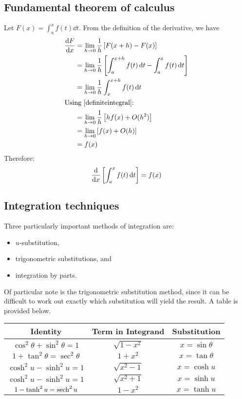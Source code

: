 \subsection{Fundamental theorem of calculus}
Let \(F(x) = \int_{a}^{x} f(t) \dd{t}\).
From the definition of the derivative, we have
\begin{align*}
	\frac{\dd{F}}{\dd{x}} & = \lim_{h \to 0} \frac{1}{h} \left[ F(x+h) - F(x) \right]                                         \\
	                      & = \lim_{h \to 0} \frac{1}{h} \left[ \int_{a}^{x+h} f(t) \dd{t} - \int_{a}^{x} f(t) \dd{t} \right] \\
	                      & = \lim_{h \to 0} \frac{1}{h} \int_{x}^{x+h} f(t) \dd{t}                                           \\
	\intertext{Using \eqref{definiteintegral}:}
	                      & = \lim_{h \to 0} \frac{1}{h} \left[ hf(x) + O(h^2) \right]                                        \\
	                      & = \lim_{h \to 0} \left[ f(x) + O(h) \right]                                                       \\
	                      & = f(x)
\end{align*}
Therefore:
\begin{equation}\label{ftc}
	\frac{\mathrm{d}}{\dd{x}} \left[ \int_{a}^{x} f(t) \dd{t} \right] = f(x)
\end{equation}

\subsection{Integration techniques}
Three particularly important methods of integration are:
\begin{itemize}
	\item \(u\)-substitution,
	\item trigonometric substitutions, and
	\item integration by parts.
\end{itemize}
Of particular note is the trigonometric substitution method, since it can be difficult to work out exactly which substitution will yield the result.
A table is provided below.

\begin{center}
\begin{tabular}{c c c}
	Identity                              & Term in Integrand  & Substitution        \\\midrule
	\(\cos^2 \theta + \sin^2 \theta = 1\) & \(\sqrt{1 - x^2}\) & \(x = \sin \theta\) \\
	\(1 + \tan^2 \theta = \sec^2 \theta\) & \(1 + x^2\)        & \(x = \tan \theta\) \\
	\(\cosh^2 u - \sinh^2 u = 1\)         & \(\sqrt{x^2 - 1}\) & \(x = \cosh u\)     \\
	\(\cosh^2 u - \sinh^2 u = 1\)         & \(\sqrt{x^2 + 1}\) & \(x = \sinh u\)     \\
	\(1 - \tanh^2 u = \sech^2 u\)         & \(1 - x^2\)        & \(x = \tanh u\)
\end{tabular}
\end{center}
